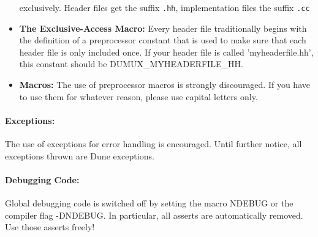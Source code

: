\begin{itemize}
      exclusively. Header files get the suffix \texttt{.hh}, implementation files the
      suffix \texttt{.cc}
\item \textbf{The Exclusive-Access Macro:} Every header file traditionally begins
      with the definition of a preprocessor constant that is used to make sure that
      each  header file is only included once. If your header file is called 
      'myheaderfile.hh', this constant should be DUMUX\_MYHEADERFILE\_HH.
\item \textbf{Macros:} The use of preprocessor macros is strongly discouraged. If you 
      have to use them for whatever reason, please use capital letters only.
\end{itemize}

\paragraph{Exceptions:}
The use of exceptions for error handling is encouraged. Until further notice,
all exceptions thrown are Dune exceptions.

\paragraph{Debugging Code:}
Global debugging code is switched off by setting the macro NDEBUG or the compiler
flag -DNDEBUG. In particular, all asserts are automatically removed. Use those
asserts freely!
